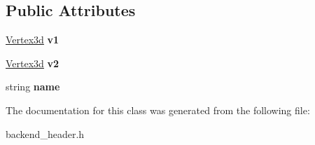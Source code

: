 \subsection*{Public Attributes}
\begin{DoxyCompactItemize}
\item 
\hyperlink{classVertex3d}{Vertex3d} {\bfseries v1}\hypertarget{classEdge3d_a1feb11be268cbaf604da371ea3e13262}{}\label{classEdge3d_a1feb11be268cbaf604da371ea3e13262}

\item 
\hyperlink{classVertex3d}{Vertex3d} {\bfseries v2}\hypertarget{classEdge3d_ad821ed1fa2a5373926f9e54a8a11545e}{}\label{classEdge3d_ad821ed1fa2a5373926f9e54a8a11545e}

\item 
string {\bfseries name}\hypertarget{classEdge3d_a916daee4354abbf04b34792336eb7f0f}{}\label{classEdge3d_a916daee4354abbf04b34792336eb7f0f}

\end{DoxyCompactItemize}


The documentation for this class was generated from the following file\+:\begin{DoxyCompactItemize}
\item 
backend\+\_\+header.\+h\end{DoxyCompactItemize}
